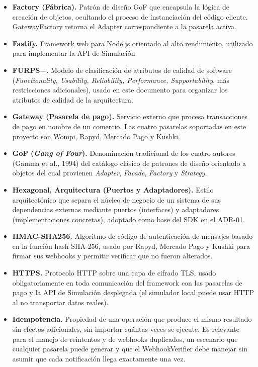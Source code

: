 \begin{itemize}
    \item \textbf{Factory (Fábrica).} Patrón de diseño GoF que encapsula la lógica de creación de objetos, ocultando el proceso de instanciación del código cliente. GatewayFactory retorna el Adapter correspondiente a la pasarela activa.
    \item \textbf{Fastify.} Framework web para Node.js orientado al alto rendimiento, utilizado para implementar la API de Simulación.
    \item \textbf{FURPS+.} Modelo de clasificación de atributos de calidad de software (\textit{Functionality, Usability, Reliability, Performance, Supportability}, más restricciones adicionales), usado en este documento para organizar los atributos de calidad de la arquitectura.
    \item \textbf{Gateway (Pasarela de pago).} Servicio externo que procesa transacciones de pago en nombre de un comercio. Las cuatro pasarelas soportadas en este proyecto son Wompi, Rapyd, Mercado Pago y Kushki.
    \item \textbf{GoF (\textit{Gang of Four}).} Denominación tradicional de los cuatro autores (Gamma et al., 1994) del catálogo clásico de patrones de diseño orientado a objetos del cual provienen \textit{Adapter}, \textit{Facade}, \textit{Factory} y \textit{Strategy}.
    \item \textbf{Hexagonal, Arquitectura (Puertos y Adaptadores).} Estilo arquitectónico que separa el núcleo de negocio de un sistema de sus dependencias externas mediante puertos (interfaces) y adaptadores (implementaciones concretas), adoptado como base del SDK en el ADR-01.
    \item \textbf{HMAC-SHA256.} Algoritmo de código de autenticación de mensajes basado en la función hash SHA-256, usado por Rapyd, Mercado Pago y Kushki para firmar sus webhooks y permitir verificar que no fueron alterados.
    \item \textbf{HTTPS.} Protocolo HTTP sobre una capa de cifrado TLS, usado obligatoriamente en toda comunicación del framework con las pasarelas de pago y la API de Simulación desplegada (el simulador local puede usar HTTP al no transportar datos reales).
    \item \textbf{Idempotencia.} Propiedad de una operación que produce el mismo resultado sin efectos adicionales, sin importar cuántas veces se ejecute. Es relevante para el manejo de reintentos y de webhooks duplicados, un escenario que cualquier pasarela puede generar y que el WebhookVerifier debe manejar sin asumir que cada notificación llega exactamente una vez.

\end{itemize}
